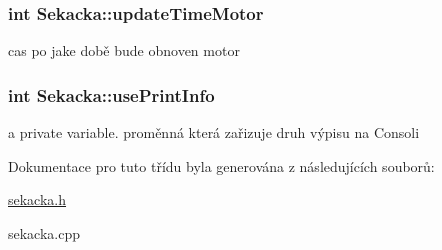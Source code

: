 \subsubsection[{\texorpdfstring{update\+Time\+Motor}{updateTimeMotor}}]{\setlength{\rightskip}{0pt plus 5cm}int Sekacka\+::update\+Time\+Motor\hspace{0.3cm}{\ttfamily [private]}}\hypertarget{class_sekacka_a8d00207d9eeb49ca50dcf1cfae2bf89a}{}\label{class_sekacka_a8d00207d9eeb49ca50dcf1cfae2bf89a}
cas po jake době bude obnoven motor 
\subsubsection[{\texorpdfstring{use\+Print\+Info}{usePrintInfo}}]{\setlength{\rightskip}{0pt plus 5cm}int Sekacka\+::use\+Print\+Info\hspace{0.3cm}{\ttfamily [private]}}\hypertarget{class_sekacka_a41aa8e032754f0b39f3d86583972e9ca}{}\label{class_sekacka_a41aa8e032754f0b39f3d86583972e9ca}
a private variable. proměnná která zařizuje druh výpisu na Consoli 

Dokumentace pro tuto třídu byla generována z následujících souborů\+:\begin{DoxyCompactItemize}
\item 
\hyperlink{sekacka_8h}{sekacka.\+h}\item 
sekacka.\+cpp\end{DoxyCompactItemize}

